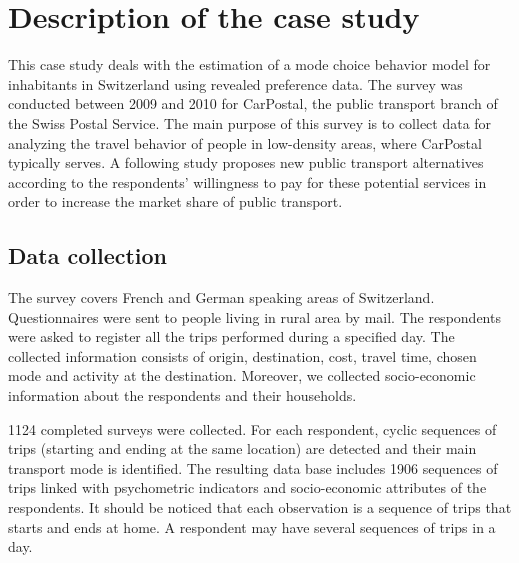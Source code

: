 \documentclass[12pt,a4paper]{article}
\begin{document}
\clearpage

\appendix

\section{Description of the case study}

This case study deals with the estimation of a mode choice behavior
model for inhabitants in Switzerland using revealed preference data.
The survey was conducted between 2009 and 2010 for CarPostal, the public transport
branch of the Swiss Postal Service. The main purpose of this survey
is to collect data for analyzing the travel behavior of people in
low-density areas, where CarPostal typically serves. A following
study proposes new public transport alternatives according to the respondents'
willingness to pay for these potential services in order to increase
the market share of public transport.


\subsection{Data collection}

The survey covers French and German speaking areas of Switzerland. Questionnaires
were sent to people living in rural area by mail. The respondents
were asked to register all the trips performed during a specified
day. The collected information consists of origin, destination,
cost, travel time, chosen mode and activity at the destination. Moreover, we collected socio-economic information about the respondents and their households.

1124 completed surveys were collected. For each respondent,
cyclic sequences of trips (starting and ending at the same location)
are detected and their main transport mode is identified. The resulting data base includes 1906 sequences of trips linked with psychometric indicators and socio-economic attributes of the respondents. It should be noticed that each observation is a sequence of trips
that starts and ends at home. A respondent may have several sequences of trips 
in a day.

\end{document}
